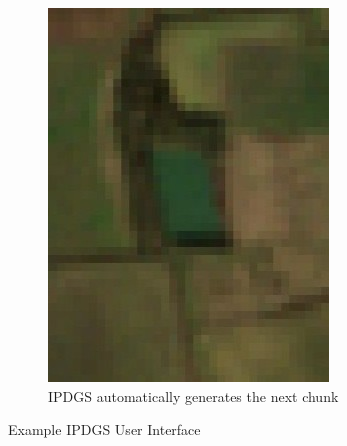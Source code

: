 \begin{figure}
\begin{subfigure}[b]{0.3\textwidth}
         \includegraphics[width=\linewidth]{contents/figures/LR 10m res.jpg}
         \caption{IPDGS automatically generates the next chunk}
         \label{fig:ipdgs ui next chunk}
     \end{subfigure}
        \caption{Example IPDGS User Interface}
        \label{fig:ipdgs ui}
\end{figure}

